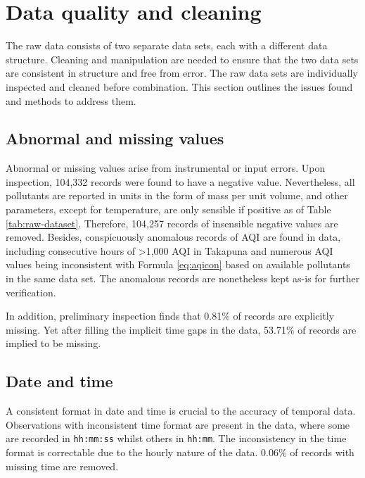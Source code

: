 \documentclass{aucklandthesis}
\begin{document}
\hypertarget{data-quality-and-cleaning}{%
\section{Data quality and cleaning}\label{data-quality-and-cleaning}}

The raw data consists of two separate data sets, each with a different data structure. Cleaning and manipulation are needed to ensure that the two data sets are consistent in structure and free from error. The raw data sets are individually inspected and cleaned before combination. This section outlines the issues found and methods to address them.

\hypertarget{sec:data-extreme-value}{%
\subsection{Abnormal and missing values}\label{sec:data-extreme-value}}

Abnormal or missing values arise from instrumental or input errors. Upon inspection, 104,332 records were found to have a negative value. Nevertheless, all pollutants are reported in units in the form of mass per unit volume, and other parameters, except for temperature, are only sensible if positive as of Table \ref{tab:raw-dataset}. Therefore, 104,257 records of insensible negative values are removed. Besides, conspicuously anomalous records of AQI are found in data, including consecutive hours of \textgreater1,000 AQI in Takapuna and numerous AQI values being inconsistent with Formula \ref{eq:aqicon} based on available pollutants in the same data set. The anomalous records are nonetheless kept as-is for further verification.

In addition, preliminary inspection finds that 0.81\% of records are explicitly missing. Yet after filling the implicit time gaps in the data, 53.71\% of records are implied to be missing.

\hypertarget{date-and-time}{%
\subsection{Date and time}\label{date-and-time}}

A consistent format in date and time is crucial to the accuracy of temporal data. Observations with inconsistent time format are present in the data, where some are recorded in \texttt{hh:mm:ss} whilst others in \texttt{hh:mm}. The inconsistency in the time format is correctable due to the hourly nature of the data. 0.06\% of records with missing time are removed.
\end{document}
